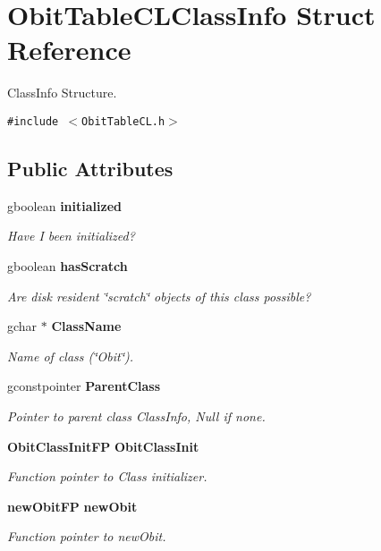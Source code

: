 \section{Obit\-Table\-CLClass\-Info Struct Reference}
\label{structObitTableCLClassInfo}
Class\-Info Structure.  


{\tt \#include $<$Obit\-Table\-CL.h$>$}

\subsection*{Public Attributes}
\begin{CompactItemize}
\item 
gboolean {\bf initialized}
\begin{CompactList}\small\item\em Have I been initialized? \item\end{CompactList}\item 
gboolean {\bf has\-Scratch}
\begin{CompactList}\small\item\em Are disk resident \char`\"{}scratch\char`\"{} objects of this class possible? \item\end{CompactList}\item 
gchar $\ast$ {\bf Class\-Name}
\begin{CompactList}\small\item\em Name of class (\char`\"{}Obit\char`\"{}). \item\end{CompactList}\item 
gconstpointer {\bf Parent\-Class}
\begin{CompactList}\small\item\em Pointer to parent class Class\-Info, Null if none. \item\end{CompactList}\item 
{\bf Obit\-Class\-Init\-FP} {\bf Obit\-Class\-Init}
\begin{CompactList}\small\item\em Function pointer to Class initializer. \item\end{CompactList}\item 
{\bf new\-Obit\-FP} {\bf new\-Obit}
\begin{CompactList}\small\item\em Function pointer to new\-Obit. \item\end{CompactList}\item 

\end{CompactItemize}
